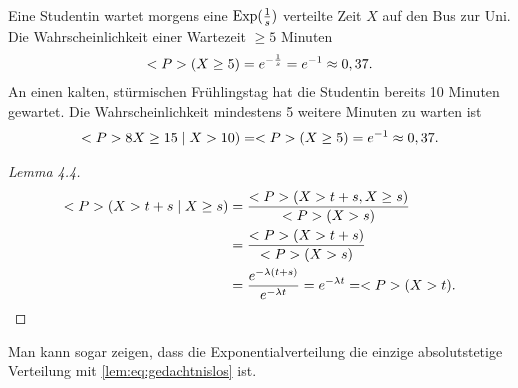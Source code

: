 \begin{example}
	Eine Studentin wartet morgens eine $\EXP(\frac{1}{s})$ verteilte Zeit $X$ auf den Bus zur Uni. Die Wahrscheinlichkeit einer Wartezeit $\ge 5$ Minuten
	\begin{align*}
		\P(X \ge 5) = e^{-\frac{1}{s}} = e^{-1} \approx 0,37.
	\end{align*}
	An einen kalten, stürmischen Frühlingstag hat die Studentin bereits 10 Minuten gewartet. Die Wahrscheinlichkeit mindestens 5 weitere Minuten zu warten ist
	\begin{align*}
		\P8X\ge 15 \mid X > 10) = \P(X\ge 5) = e^{-1} \approx 0,37.
	\end{align*}
\end{example}
\begin{proof}[Lemma 4.4]
	\begin{align*}
		\P(X > t+s \mid X \ge s) &= \frac{\P(X> t+s, X \ge s)}{\P(X > s)}\\
		&= \frac{\P(X > t+s)}{\P(X > s)}\\
		&= \frac{e^{-\lambda(t+s)}}{e^{-\lambda t}} = e^{-\lambda t} = \P(X> t).
	\end{align*}
\end{proof}
\begin{*hint}
	Man kann sogar zeigen, dass die Exponentialverteilung die einzige absolutstetige Verteilung mit \eqref{lem:eq:gedachtnislos} ist.
\end{*hint}